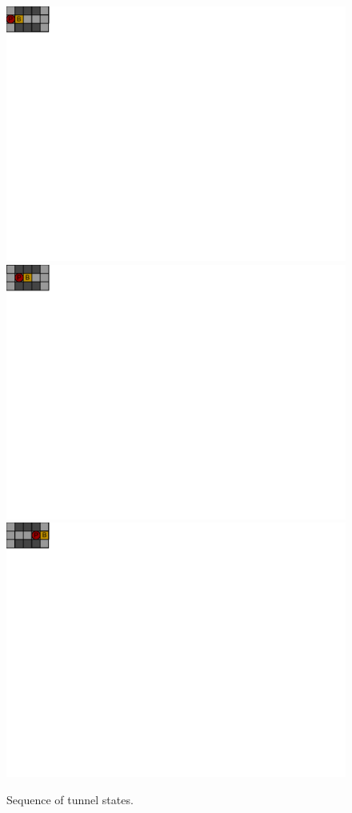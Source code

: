 \documentclass[a4paper,11pt]{article}
\renewcommand{\*}[0]{\cdot}
\begin{document}
\begin{figure}[h!]
    \begin{center}
        \includegraphics{figures/insideTunnel1}
        \includegraphics{figures/insideTunnel2}
        \includegraphics{figures/insideTunnel3}
    \end{center}
    \caption{Sequence of tunnel states.}
    \label{fig:insideTunnel}
\end{figure}
\end{document}
